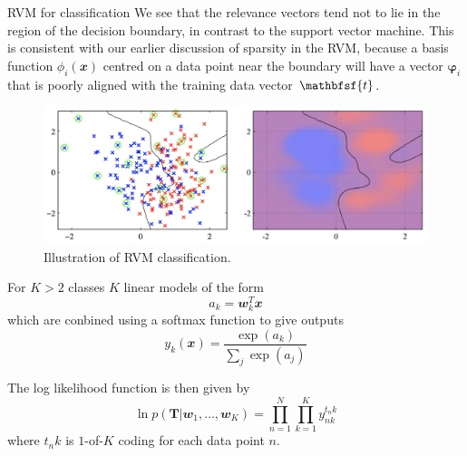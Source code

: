\documentclass{bredelebeamer}
\begin{document}
\begin{frame}{RVM for classification}
  We see that the relevance vectors tend not to lie in the region of the decision
  boundary, in contrast to the support vector machine. This is consistent with our
  earlier discussion of sparsity in the RVM, because a basis function $\phi_i(\mathbfit{x})$
  centred on a data point near the boundary will have a vector $\boldsymbol{\varphi}_i$
  that is poorly aligned with the training data vector $\mathbfsf{t}$.
  \begin{figure}
  \centering
  \includegraphics[scale=0.35]{rvm_classification.png}
  \caption{
    Illustration of RVM classification.
  }
  \end{figure}
\end{frame}


\begin{frame}{For $K > 2$ classes}
  $K$ linear models of the form
  \begin{equation}
    a_k = \mathbfit{w}_k^T \mathbfit{x}
  \end{equation}
  which are conbined using a softmax function to give outputs
  \begin{equation}
    y_k(\mathbfit{x}) = \frac{\exp(a_k)}{\sum_j \exp(a_j)}
  \end{equation}

  The log likelihood function is then given by
  \begin{equation}
    \ln p(\mathbf{T} | \mathbfit{w}_1, \ldots, \mathbfit{w}_K)
    = \prod_{n=1}^N \prod_{k=1}^K y_{nk}^{t_nk}
  \end{equation}
  where $t_nk$ is $1$-of-$K$ coding for each data point $n$.
\end{frame}

\end{document}

